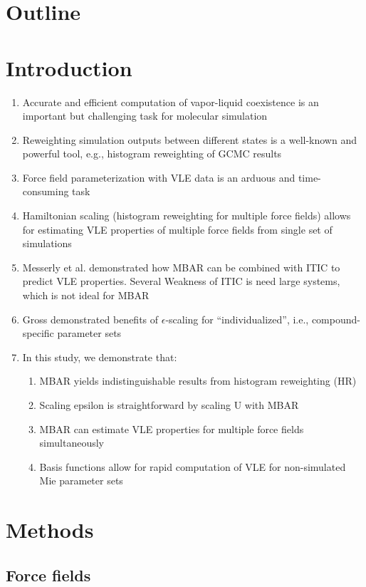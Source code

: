 \documentclass[11pt,a4paper]{article}
\begin{document}
\section*{Outline}

\section{Introduction}

\begin{enumerate}
	\item Accurate and efficient computation of vapor-liquid coexistence is an important but challenging task for molecular simulation
	\item Reweighting simulation outputs between different states is a well-known and powerful tool, e.g., histogram reweighting of GCMC results
	\item Force field parameterization with VLE data is an arduous and time-consuming task
	\item Hamiltonian scaling (histogram reweighting for multiple force fields) allows for estimating VLE properties of multiple force fields from single set of simulations
	\item Messerly et al. demonstrated how MBAR can be combined with ITIC to predict VLE properties. Several  Weakness of ITIC is need large systems, which is not ideal for MBAR
	\item Gross demonstrated benefits of $\epsilon$-scaling for ``individualized'', i.e., compound-specific parameter sets
	\item In this study, we demonstrate that:
	\begin{enumerate}
		\item MBAR yields indistinguishable results from histogram reweighting (HR)
		\item Scaling epsilon is straightforward by scaling U with MBAR
		\item MBAR can estimate VLE properties for multiple force fields simultaneously
		\item Basis functions allow for rapid computation of VLE for non-simulated Mie parameter sets
	\end{enumerate}
\end{enumerate}

\section{Methods}

\subsection{Force fields}
\end{document}
